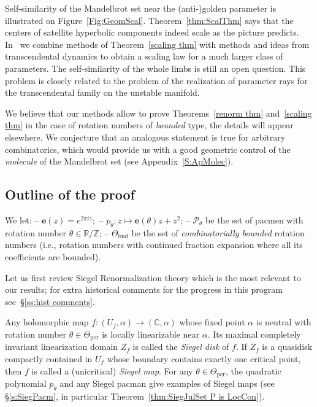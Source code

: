 \documentclass[]{amsart}
\newcommand{\ee}{\mathbf e}
\newcommand\PP{\mathcal{P}}
\newcommand{\C}{\mathbb{C}}
\newcommand{\R}{\mathbb{R}}
\newcommand{\Z}{\mathbb{Z}}
\theoremstyle{remark}
\numberwithin{equation}{section}
\theoremstyle{definition}
\def\ssk{\smallskip}
\def\nin{\noindent}
\newcommand{\per}{{\mathrm{per}}}
\newcommand{\bnd}{{\mathrm{bnd}}}
\newcommand{\ra}{\rightarrow}
\begin{document}
 Self-similarity of the Mandelbrot set near the (anti-)golden parameter is illustrated on Figure~\ref{Fig:GeomScal}. Theorem~\ref{thm:ScalThm} says that the centers of satellite hyperbolic components indeed scale as the picture predicts. In~\cite{DL} we combine methods of Theorem~\ref{scaling thm} with methods and ideas from transcendental dynamics to obtain a scaling law for a much larger class of parameters. The self-similarity of the whole limbs is still an open question. This problem is closely related to the problem of the realization of parameter rays for the transcendental family on the unstable manifold. 




We believe that our methods allow to prove Theorems~\ref{renorm thm} and~\ref{scaling thm} in the case of rotation numbers of
{\em bounded} type, the details will appear elsewhere.  We  conjecture that an analogous statement is true for arbitrary combinatorics, which  would provide us with a good geometric control 
of the {\em molecule} of the Mandelbrot set (see Appendix~\ref{S:ApMolec}). 




\subsection{Outline of the proof}
\label{ss:out of the proof}
We let:
\newline \ssk\nin -- $\ee(z)=e^ {2\pi i z};$ 
\newline \ssk\nin 
-- $p_\theta : z\mapsto \ee(\theta) z + z^2$;
\newline\ssk\nin
-- $\PP_\theta$ be the set of pacmen with rotation number $\theta\in \R/\Z$;
\newline \ssk\nin
--  $\Theta_\bnd$ be the set of {\em  combinatorially bounded}
rotation numbers (i.e., rotation numbers with  continued
fraction expansion where all its coefficients are bounded).


Let us first review Siegel Renormalization theory which is the most relevant to our results; for extra historical comments for the progress in this program see~\S\ref{ss:hist comments}.



Any holomorphic map  $f : (U_f, \alpha) \ra (\C, \alpha)$  whose fixed
point $\alpha$ is neutral with rotation
number $\theta\in \Theta_\per$ is locally linearizable near $\alpha$.
Its maximal completely invariant linearization domain $Z_f$ is
called the {\em Siegel disk} of $f$.  
If $\overline Z_f$ is a quasidisk compactly contained in $U_f$ whose boundary
contains exactly one  critical point, then $f$ is called  
a  (unicritical) {\em Siegel map}. 
For any $\theta\in \Theta_\per $, the  quadratic polynomial $p_\theta $ and
any Siegel pacman give examples of Siegel maps (see \S\ref{s:SiegPacm}, in particular Theorem~\ref{thm:SiegJulSet P is LocCon}).
\end{document}
